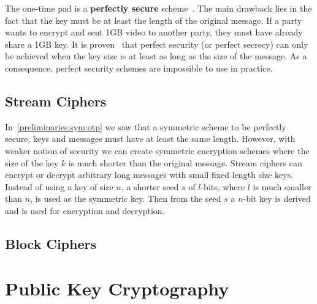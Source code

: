 The one-time pad is a \textbf{perfectly secure} scheme~\cite{kiagias:crypto, boneh_crypto}. The main drawback lies in the fact that the key must be at least the length of the original message. If a party wants to encrypt and sent 1GB video to another party, they must have already share a 1GB key. It is proven~\cite{shannon_otp} that perfect security (or perfect secrecy) can only be achieved when the key size is at least as long as the size of the message. As a consequence, perfect security schemes are impossible to use in practice.

\subsection{Stream Ciphers}
\label{preliminaries:sym:stream}

In~\ref{preliminaries:sym:otp} we saw that a symmetric scheme to be perfectly secure, keys and messages must have at least the same length. However, with weaker notion of security we can create symmetric encryption schemes where the size of the key $k$ is much shorter than the original message. Stream ciphers can encrypt or decrypt arbitrary long messages with small fixed length size keys. Instead of using a key of size $n$, a shorter seed $s$ of $l$-bits, where $l$ is much smaller than $n$, is used as the symmetric key. Then from the seed $s$ a $n$-bit key is derived and is used for encryption and decryption.



\subsection{Block Ciphers}
\label{preliminaries:sym:block}

\section{Public Key Cryptography}
\label{preliminaries:pub}

